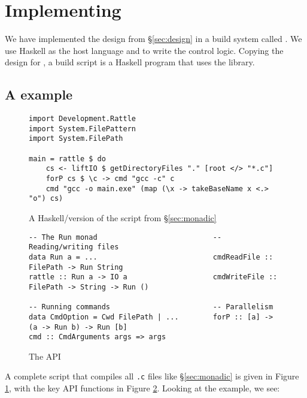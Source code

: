 \section{Implementing \Rattle}
\label{sec:implementation}

We have implemented the design from \S\ref{sec:design} in a build system called \Rattle. We use Haskell as the host language and to write the control logic. Copying the design for \Shake \cite{shake}, a \Rattle build script is a Haskell program that uses the \Rattle library.

\subsection{A \Rattle example}

\begin{figure}
  \begin{small}
\begin{verbatim}
import Development.Rattle
import System.FilePattern
import System.FilePath

main = rattle $ do
    cs <- liftIO $ getDirectoryFiles "." [root </> "*.c"]
    forP cs $ \c -> cmd "gcc -c" c
    cmd "gcc -o main.exe" (map (\x -> takeBaseName x <.> "o") cs)
\end{verbatim}
\end{small}
\caption{A Haskell/\Rattle version of the script from \S\ref{sec:monadic}}
\label{fig:rattle_example}
\end{figure}

\begin{figure}
\begin{small}
\begin{verbatim}
-- The Run monad                           -- Reading/writing files
data Run a = ...                           cmdReadFile :: FilePath -> Run String
rattle :: Run a -> IO a                    cmdWriteFile :: FilePath -> String -> Run ()

-- Running commands                        -- Parallelism
data CmdOption = Cwd FilePath | ...        forP :: [a] -> (a -> Run b) -> Run [b]
cmd :: CmdArguments args => args
\end{verbatim}
\end{small}
\caption{The \Rattle API}
\label{fig:api}
\end{figure}

A complete \Rattle script that compiles all \texttt{.c} files like \S\ref{sec:monadic} is given in Figure \ref{fig:rattle_example}, with the key API functions in Figure \ref{fig:api}. Looking at the example, we see:

